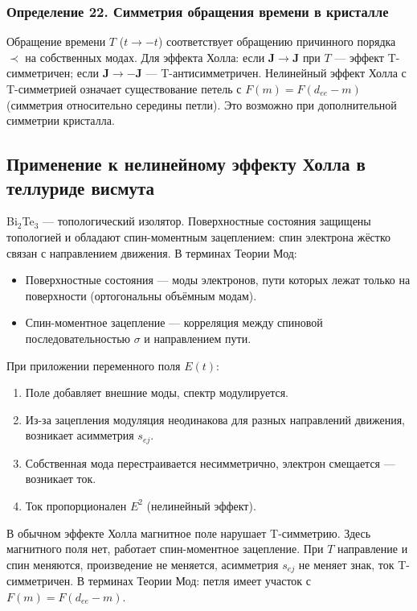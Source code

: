\documentclass[12pt,a4paper]{article}
\begin{document}
\subsubsection{Определение 22. Симметрия обращения времени в кристалле}
Обращение времени $T$ ($t \to -t$) соответствует обращению причинного порядка $\prec$ на собственных модах. Для эффекта Холла: если $\mathbf{J} \to \mathbf{J}$ при $T$ --- эффект T-симметричен; если $\mathbf{J} \to -\mathbf{J}$ --- T-антисимметричен. Нелинейный эффект Холла с T-симметрией означает существование петель с $F(m) = F(d_{ee}-m)$ (симметрия относительно середины петли). Это возможно при дополнительной симметрии кристалла.

\subsection{Применение к нелинейному эффекту Холла в теллуриде висмута}
Bi$_2$Te$_3$ --- топологический изолятор. Поверхностные состояния защищены топологией и обладают спин-моментным зацеплением: спин электрона жёстко связан с направлением движения. В терминах Теории Мод:
\begin{itemize}
    \item Поверхностные состояния --- моды электронов, пути которых лежат только на поверхности (ортогональны объёмным модам).
    \item Спин-моментное зацепление --- корреляция между спиновой последовательностью $\sigma$ и направлением пути.
\end{itemize}

При приложении переменного поля $E(t)$:
\begin{enumerate}
    \item Поле добавляет внешние моды, спектр модулируется.
    \item Из-за зацепления модуляция неодинакова для разных направлений движения, возникает асимметрия $s_{ej}$.
    \item Собственная мода перестраивается несимметрично, электрон смещается --- возникает ток.
    \item Ток пропорционален $E^2$ (нелинейный эффект).
\end{enumerate}

В обычном эффекте Холла магнитное поле нарушает T-симметрию. Здесь магнитного поля нет, работает спин-моментное зацепление. При $T$ направление и спин меняются, произведение не меняется, асимметрия $s_{ej}$ не меняет знак, ток T-симметричен. В терминах Теории Мод: петля имеет участок с $F(m) = F(d_{ee}-m)$.
\end{document}

